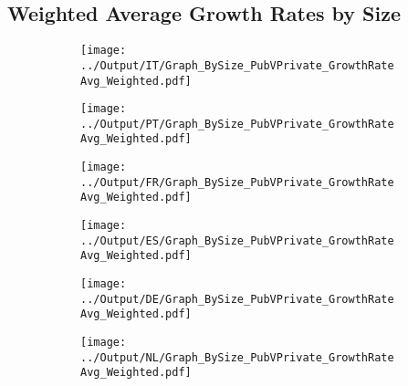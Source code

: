 \documentclass[12pt,notitlepage]{article}
\begin{document}
\subsection{Weighted Average Growth Rates by Size}
\begin{figure}[!htpb]
\centering
\begin{subfigure}{.49\textwidth}
    \centering
 \texttt{[image: ../Output/IT/Graph\_BySize\_PubVPrivate\_GrowthRateAvg\_Weighted.pdf]}
\end{subfigure}%
\begin{subfigure}{.49\textwidth}
    \centering
 \texttt{[image: ../Output/PT/Graph\_BySize\_PubVPrivate\_GrowthRateAvg\_Weighted.pdf]}
\end{subfigure}
\begin{subfigure}{.49\textwidth}
    \centering
 \texttt{[image: ../Output/FR/Graph\_BySize\_PubVPrivate\_GrowthRateAvg\_Weighted.pdf]}
\end{subfigure}%
\begin{subfigure}{.49\textwidth}
    \centering
 \texttt{[image: ../Output/ES/Graph\_BySize\_PubVPrivate\_GrowthRateAvg\_Weighted.pdf]}
\end{subfigure}
\begin{subfigure}{.49\textwidth}
    \centering
 \texttt{[image: ../Output/DE/Graph\_BySize\_PubVPrivate\_GrowthRateAvg\_Weighted.pdf]}
\end{subfigure}
\begin{subfigure}{.49\textwidth}
    \centering
 \texttt{[image: ../Output/NL/Graph\_BySize\_PubVPrivate\_GrowthRateAvg\_Weighted.pdf]}
\end{subfigure}
\end{figure}
\end{document}
